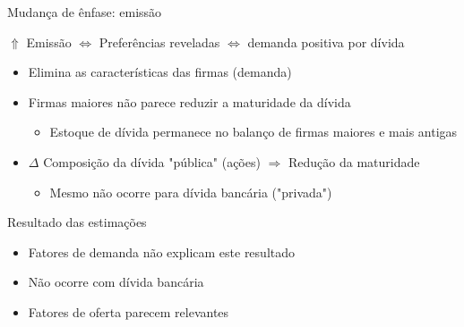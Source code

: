 \documentclass[presentation]{beamer}
\begin{document}
\begin{frame}[label={sec:org78ee7a6}]{Mudança de ênfase: emissão}
\begin{center}
\(\Uparrow\) Emissão \(\Leftrightarrow\) Preferências reveladas \(\Leftrightarrow\) demanda positiva por dívida
\end{center}

\begin{itemize}
\item Elimina as características das firmas (demanda)
\item Firmas maiores não parece reduzir a maturidade da dívida
\begin{itemize}
\item Estoque de dívida permanece no balanço de firmas maiores e mais antigas
\end{itemize}
\item \(\Delta\) Composição da dívida "pública" (ações) \(\Rightarrow\) Redução da maturidade
\begin{itemize}
\item Mesmo não ocorre para dívida bancária ("privada")
\end{itemize}
\end{itemize}

\begin{block}{Resultado das estimações}
\begin{itemize}
\item Fatores de demanda não explicam este resultado
\item Não ocorre com dívida bancária
\item Fatores de oferta parecem relevantes
\end{itemize}
\end{block}
\end{frame}
\end{document}

